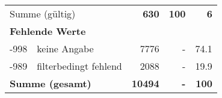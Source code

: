 \begin{longtable}{lXrrr}
     \midrule
     \multicolumn{2}{l}{Summe (gültig)} &
       \textbf{\num{630}} &
     \textbf{100} &
       \textbf{\num[round-mode=places,round-precision=2]{6}} \\
     \multicolumn{5}{l}{\textbf{Fehlende Werte}}\\
       -998 &
       keine Angabe &
         \num{7776} &
        - &
         \num[round-mode=places,round-precision=2]{74,1} \\
       -989 &
       filterbedingt fehlend &
         \num{2088} &
        - &
         \num[round-mode=places,round-precision=2]{19,9} \\
     \midrule
     \multicolumn{2}{l}{\textbf{Summe (gesamt)}} &
          \textbf{\num{10494}} &
        \textbf{-} &
        \textbf{100} \\
     \bottomrule
     \end{longtable}
     
